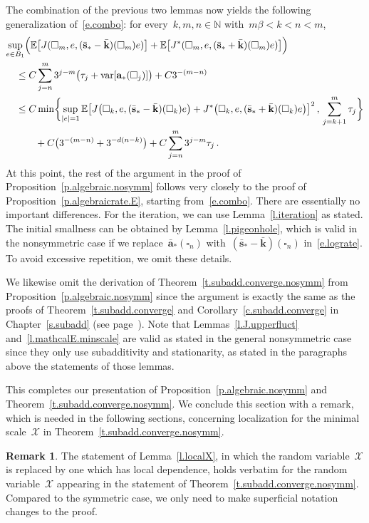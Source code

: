 \documentclass[11pt,twoside]{article} %
\let\oldsquare\square %
\renewcommand{\square}{\oldsquare}
\numberwithin{equation}{section}
\theoremstyle{definition}
\newtheorem{remark}[theorem]{Remark}
\let\originalleft\left
\let\originalright\right
\renewcommand{\left}{\mathopen{}\mathclose\bgroup\originalleft}
\renewcommand{\right}{\aftergroup\egroup\originalright}
\newcommand*{\N}{\ensuremath{\mathbb{N}}}
\renewcommand{\a}{\mathbf{a}}
\newcommand{\ahom}{\bar{\a}}
\newcommand{\shom}{\bar{\mathbf{s}}}
\newcommand{\khom}{\bar{\mathbf{k}}}
\newcommand{\cu}{\square}
\newcommand{\E}{\mathbb{E}}
\newcommand{\X}{\mathcal{X}}
\DeclareMathOperator{\var}{var}
\begin{document}
The combination of the previous two lemmas now yields the following generalization of~\eqref{e.combo}: for every~$k,m,n\in\N$ with~$m\beta < k < n< m$,
\begin{align}
\label{e.combo.nosymm}
\lefteqn{
\sup_{e\in B_1}
\Bigl (
\E \left[ J(\cu_m,e,(\shom_*-\khom)(\cu_m)e) \right]
+\E \left[ J^*(\cu_m,e,(\shom_*+\khom)(\cu_m)e) \right]
\Bigr )
} \quad & 
\notag \\ &
\leq 
C 
\sum_{j=n}^{m} 3^{j-m} 
\bigl( \tau_j + \var[ \a_*(\cu_j) ]  \bigr)
+C 3^{-(m-n)}
\notag \\ & 
\leq 
C\min \biggl \{
\sup_{|e|=1}
\E \bigl[ J\bigl (\cu_k,e,(\shom_*-\khom)(\cu_k) e\bigr ) +  J^*\bigl (\cu_k,e,(\shom_*+\khom)(\cu_k) e\bigr )\bigr]^2
\,,\, \sum_{j=k+1}^m \tau_j
\biggr\} 
\notag \\ & \qquad
+
C 
\bigl( 3^{-(m-n)} + 3^{-d(n-k)} \bigr)
+
C\sum_{j=n}^m 3^{j-m} \tau_j
\,.
\end{align}
At this point, the rest of the argument in the proof of Proposition~\ref{p.algebraic.nosymm} follows very closely to the proof of Proposition~\ref{p.algebraicrate.E}, starting from~\eqref{e.combo}. There are essentially no important differences. For the iteration, we can use Lemma~\ref{l.iteration} as stated. The initial smallness can be obtained by Lemma~\ref{l.pigeonhole}, which is valid in the nonsymmetric case if we replace~$\ahom_*(\cu_n)$ with~$(\shom_*-\khom)(\cu_n)$ in~\eqref{e.lograte}. To avoid excessive repetition, we omit these details. 

\smallskip

We likewise omit the derivation of Theorem~\ref{t.subadd.converge.nosymm} from Proposition~\ref{p.algebraic.nosymm} since the argument is exactly the same as the proofs of Theorem~\ref{t.subadd.converge} and Corollary~\ref{c.subadd.converge} in Chapter~\ref{s.subadd} (see page~\pageref{proof.t.subadd.converge}). Note that Lemmas~\ref{l.J.upperfluct} and~\ref{l.mathcalE.minscale} are valid as stated in the general nonsymmetric case since they only use subadditivity and stationarity, as stated in the paragraphs above the statements of those lemmas. 

\smallskip

This completes our presentation of Proposition~\ref{p.algebraic.nosymm} and Theorem~\ref{t.subadd.converge.nosymm}. We conclude this section with a remark, which is needed in the following sections, concerning localization for the minimal scale~$\X$ in Theorem~\ref{t.subadd.converge.nosymm}.

\begin{remark} 
\label{r.localX.nonsymm}
The statement of Lemma~\ref{l.localX}, in which the random variable~$\X$ is replaced by one which has local dependence, holds verbatim for the random variable~$\X$ appearing in the statement of Theorem~\ref{t.subadd.converge.nosymm}. Compared to the symmetric case, 
we only need to make superficial notation changes to the proof. 
\end{remark}
\end{document}
